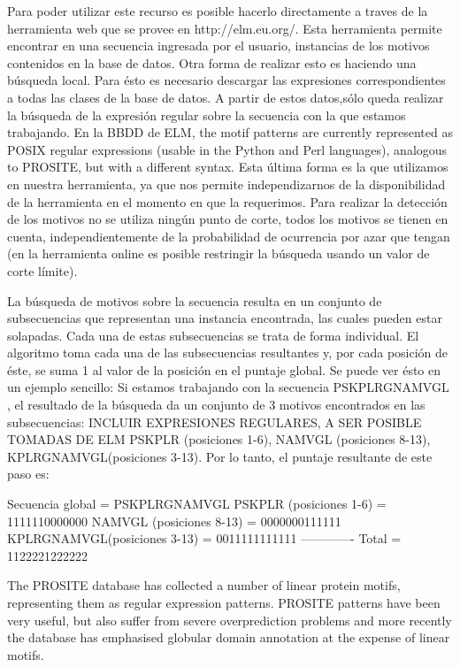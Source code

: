 Para poder utilizar este recurso es posible hacerlo directamente a traves de la herramienta web que se provee en http://elm.eu.org/. Esta herramienta permite encontrar en una secuencia ingresada por el usuario, instancias de los motivos contenidos en la base de datos.
Otra forma de realizar esto es haciendo una búsqueda local. Para ésto es necesario descargar las expresiones correspondientes a todas las clases de la base de datos. 
A partir de estos datos,sólo queda realizar la búsqueda de la expresión regular sobre la secuencia con la que estamos trabajando.
En la BBDD de ELM, the motif patterns are currently represented as POSIX regular expressions (usable in the Python and Perl languages), analogous to PROSITE, but with a different syntax.
Esta última forma es la que utilizamos en nuestra herramienta, ya que nos permite independizarnos de la disponibilidad de la herramienta en el momento en que la requerimos.
Para realizar la detección de los motivos no se utiliza ningún punto de corte, todos los motivos se tienen en cuenta, independientemente de la probabilidad de ocurrencia por azar que tengan (en la herramienta online es posible restringir la búsqueda usando un valor de corte límite).

La búsqueda de motivos sobre la secuencia resulta en un conjunto de subsecuencias que representan una instancia encontrada, las cuales pueden estar solapadas. Cada una de estas subsecuencias se trata de forma individual.
El algoritmo toma cada una de las subsecuencias resultantes y, por cada posición de éste, se suma 1 al valor de la posición en el puntaje global.
Se puede ver ésto en un ejemplo sencillo:
Si estamos trabajando con la secuencia PSKPLRGNAMVGL , el resultado de la búsqueda da un conjunto de 3 motivos encontrados en las subsecuencias: INCLUIR EXPRESIONES REGULARES, A SER POSIBLE TOMADAS DE ELM
PSKPLR (posiciones 1-6), NAMVGL (posiciones 8-13), KPLRGNAMVGL(posiciones 3-13).
Por lo tanto, el puntaje resultante de este paso es:

Secuencia global             =   PSKPLRGNAMVGL
PSKPLR (posiciones 1-6)      =   1111110000000 
NAMVGL (posiciones 8-13)     =   0000000111111  
KPLRGNAMVGL(posiciones 3-13) =   0011111111111
 -------------
Total                        =   1122221222222


The PROSITE database has collected a number of linear protein motifs, representing them as regular expression patterns. 
PROSITE patterns have been very useful, but also suffer from severe overprediction problems and more recently the database has emphasised globular domain annotation at the expense of linear motifs.


